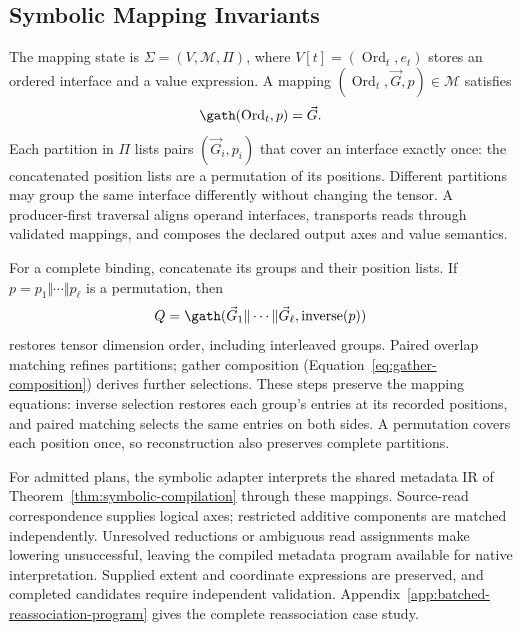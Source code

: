 \subsection{Symbolic Mapping Invariants}
\label{app:symbolic-mapping-reassociation}
The mapping state is $\Sigma=(V,\mathcal M,\Pi)$, where
$V[t]=(\operatorname{Ord}_t,e_t)$ stores an ordered interface and a value expression.
A mapping $(\operatorname{Ord}_t,\vec G,p)\in\mathcal M$ satisfies
\begin{equation}
 \gath(\operatorname{Ord}_t,p)=\vec G.
 \label{extended:eq:mapping-invariant}
\end{equation}
Each partition in $\Pi$ lists pairs $(\vec G_i,p_i)$ that cover an
interface exactly once: the concatenated position lists are a permutation
of its positions. Different partitions may group the same interface
differently without changing the tensor. A producer-first traversal
aligns operand interfaces, transports reads through validated mappings,
and composes the declared output axes and value semantics.

For a complete binding, concatenate its groups and their position lists.
If $p=p_1\Vert\cdots\Vert p_\ell$ is a permutation, then
\begin{equation}
 Q=\gath(\vec G_1\Vert\cdots\Vert\vec G_\ell,\operatorname{inverse}(p))
 \label{extended:eq:rebuilt-interfaces}
\end{equation}
restores tensor dimension order, including interleaved groups.
Paired overlap matching refines partitions; gather composition
(Equation~\eqref{eq:gather-composition}) derives further selections.
These steps preserve the mapping equations: inverse selection restores
each group's entries at its recorded positions, and paired matching selects
the same entries on both sides. A permutation covers each position once,
so reconstruction also preserves complete partitions.

\label{app:mappings-to-attribute-programs}
For admitted plans, the symbolic adapter interprets the shared metadata IR
of Theorem~\ref{thm:symbolic-compilation} through these mappings. Source-read
correspondence supplies logical axes; restricted additive components are
matched independently. Unresolved reductions or ambiguous read assignments
make lowering unsuccessful, leaving the compiled metadata program available
for native interpretation. Supplied extent and coordinate expressions are
preserved, and completed candidates require independent validation.
Appendix~\ref{app:batched-reassociation-program} gives the complete
reassociation case study.


